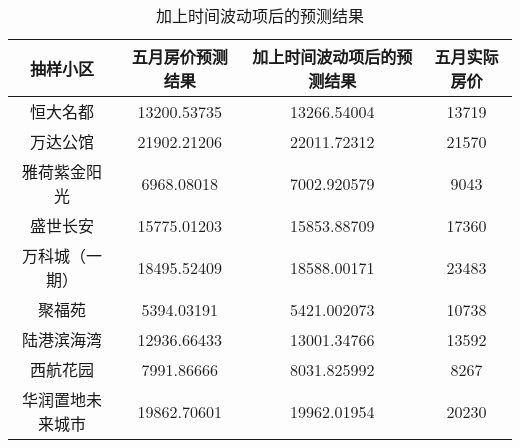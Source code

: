 \documentclass[12pt,a4paper,oneside]{ctexart}
\begin{document}
\begin{table}[H]
   \centering\small
   \caption{加上时间波动项后的预测结果}
     \begin{tabular}{cccc}
       \toprule
       抽样小区&五月房价预测结果&加上时间波动项后的预测结果&五月实际房价\\
     \midrule
     恒大名都  & 13200.53735  & 13266.54004 & 13719 \\
     万达公馆  & 21902.21206  & 22011.72312 & 21570 \\
     雅荷紫金阳光 & 6968.08018  & 7002.920579 & 9043 \\
     盛世长安  & 15775.01203  & 15853.88709 & 17360 \\
     万科城（一期） & 18495.52409  & 18588.00171 & 23483 \\
     聚福苑   & 5394.03191  & 5421.002073 & 10738 \\
     陆港滨海湾 & 12936.66433  & 13001.34766 & 13592 \\
     西航花园  & 7991.86666  & 8031.825992 & 8267 \\
     华润置地未来城市 & 19862.70601  & 19962.01954 & 20230 \\
     \bottomrule
     \end{tabular}%
 \end{table}%
 \fi
\end{document}
